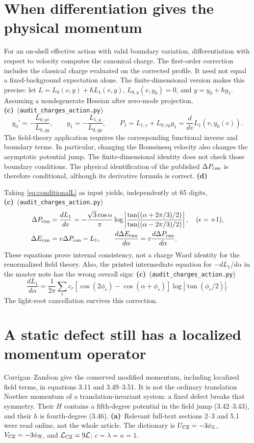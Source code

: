 \documentclass[11pt,a4paper]{article}
\newcommand{\Lc}{\textbf{(c)}}
\newcommand{\Ld}{\textbf{(d)}}
\newcommand{\La}{\textbf{(a)}}
\newcommand{\scr}{\texttt{audit\_\allowbreak charges\_\allowbreak action.py}}
\begin{document}
\section{When differentiation gives the physical momentum}
For an on-shell effective action with valid boundary variation,
differentiation with respect to velocity computes the canonical charge. The
first-order correction includes the classical charge evaluated on the
corrected profile. It need not equal a fixed-background expectation alone.
The finite-dimensional version makes this precise: let
$L=L_0(v,y)+\hbar L_1(v,y)$, $L_{0,y}(v,y_0)=0$, and
$y=y_0+\hbar y_1$. Assuming a nondegenerate Hessian after zero-mode projection,
\Lc\ (\scr)
\begin{equation}
 y_0'=-\frac{L_{0,yv}}{L_{0,yy}},\qquad
 y_1=-\frac{L_{1,y}}{L_{0,yy}},\qquad
 P_1=L_{1,v}+L_{0,vy}y_1
     =\frac{d}{dv}L_1(v,y_0(v)).
 \label{eq:saddle}
\end{equation}
The field-theory application requires the corresponding functional inverse
and boundary terms. In particular, changing the Boussinesq velocity also
changes the asymptotic potential jump. The finite-dimensional identity does
not check those boundary conditions. The physical identification of the
published $\Delta P_{\rm can}$ is therefore conditional, although its
derivative formula is correct. \Ld

Taking \eqref{eq:conditionalL} as input yields, independently at 65 digits,
\Lc\ (\scr)
\begin{align}
 \Delta P_{\rm can}&=\frac{dL_1}{dv}
 =-\frac{\sqrt3\cos\alpha}{\pi}
   \log\left|\frac{\tan((\alpha+2\pi/3)/2)}
                    {\tan((\alpha-2\pi/3)/2)}\right|,\quad (\epsilon=+1),\\
 \Delta E_{\rm can}&=v\Delta P_{\rm can}-L_1,\qquad
 \frac{d\Delta E_{\rm can}}{d\alpha}
       =v\frac{d\Delta P_{\rm can}}{d\alpha}.
\end{align}
These equations prove internal consistency, not a charge Ward identity for
the renormalized field theory. Also, the printed intermediate equation
for $-dL_1/d\alpha$ in the master note has the wrong overall sign:
\Lc\ (\scr)
\begin{equation}
 \frac{dL_1}{d\alpha}=\frac1{2\pi}\sum_r c_r
 [\cos(2\phi_r)-\cos(\alpha+\phi_r)]
 \log|\tan(\phi_r/2)|.
\end{equation}
The light-root cancellation survives this correction.

\section{A static defect still has a localized momentum operator}
Corrigan--Zambon give the conserved modified momentum, including localized
field terms, in equations 3.11 and 3.49--3.51. It is not the ordinary
translation Noether momentum of a translation-invariant system: a fixed
defect breaks that symmetry. Their $H$ contains a fifth-degree potential
in the field jump (3.42--3.43), and their $h$ is fourth-degree (3.46).
\La\ Relevant full-text sections 2--3 and 5.1 were read online, not the
whole article. The dictionary is $U_{\rm CZ}=-3\phi_L$,
$V_{\rm CZ}=-3\phi_R$, and $\mathcal L_{\rm CZ}=9\mathcal L$;
$c=\lambda=\kappa=1$.
\end{document}

